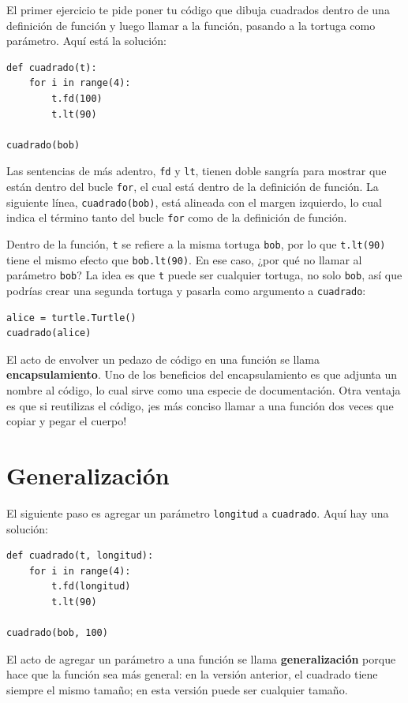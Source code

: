 \documentclass[10pt]{book}
\begin{document}
El primer ejercicio te pide poner tu código que dibuja cuadrados
dentro de una definición de función y luego llamar a la función, pasando
a la tortuga como parámetro.  Aquí está la solución:

\begin{verbatim}
def cuadrado(t):
    for i in range(4):
        t.fd(100)
        t.lt(90)

cuadrado(bob)
\end{verbatim}
%
Las sentencias de más adentro, {\tt fd} y {\tt lt}, tienen doble sangría para
mostrar que están dentro del bucle {\tt for}, el cual está dentro de la
definición de función.  La siguiente línea, {\tt cuadrado(bob)}, está alineada con
el margen izquierdo, lo cual indica el término tanto del bucle {\tt for}
como de la definición de función.

Dentro de la función, {\tt t} se refiere a la misma tortuga {\tt bob}, por lo que
{\tt t.lt(90)} tiene el mismo efecto que {\tt bob.lt(90)}.  En ese
caso, ¿por qué no
llamar al parámetro {\tt bob}?  La idea es que {\tt t} puede ser cualquier
tortuga, no solo {\tt bob}, así que podrías crear una segunda tortuga y
pasarla como argumento a {\tt cuadrado}:

\begin{verbatim}
alice = turtle.Turtle()
cuadrado(alice)
\end{verbatim}
%
El acto de envolver un pedazo de código en una función se llama {\bf
encapsulamiento}.  Uno de los beneficios del encapsulamiento es que
adjunta un nombre al código, lo cual sirve como una especie de documentación.
Otra ventaja es que si reutilizas el código, ¡es más conciso
llamar a una función dos veces que copiar y pegar el cuerpo!


\section{Generalización}

El siguiente paso es agregar un parámetro {\tt longitud} a {\tt cuadrado}.
Aquí hay una solución:

\begin{verbatim}
def cuadrado(t, longitud):
    for i in range(4):
        t.fd(longitud)
        t.lt(90)

cuadrado(bob, 100)
\end{verbatim}
%
El acto de agregar un parámetro a una función se llama {\bf generalización}
porque hace que la función sea más general: en la versión
anterior, el cuadrado tiene siempre el mismo tamaño; en esta versión
puede ser cualquier tamaño.
\end{document}
